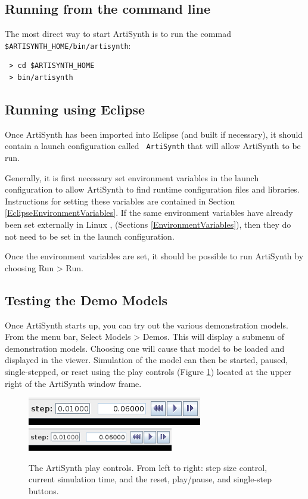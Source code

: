 \documentclass{article}
\def\SEP{/}
\def\SYSTEM{Linux }
\begin{document}
\subsection{Running from the command line}
\label{artisynthCommandLine}

The most direct way to start ArtiSynth is to run the commad
{\tt \$ARTISYNTH\_HOME\SEP bin\SEP artisynth}:

\begin{verbatim}
 > cd $ARTISYNTH_HOME
 > bin/artisynth
\end{verbatim}

\subsection{Running using Eclipse}

Once ArtiSynth has been imported into Eclipse (and built if
necessary), it should contain a launch configuration called {\tt
ArtiSynth} that will allow ArtiSynth to be run.

Generally, it is first necessary set environment variables in the
launch configuration to allow ArtiSynth to find runtime configuration
files and libraries. Instructions for setting these variables are
contained in Section \ref{EclipseEnvironmentVariables}.  If the same
environment variables have already been set externally in \SYSTEM,
(Sections \ref{EnvironmentVariables}), then they do not need to be set
in the launch configuration.

Once the environment variables are set, it should be possible to run
ArtiSynth by choosing {\sf Run > Run}.

\subsection{Testing the Demo Models}

Once ArtiSynth starts up, you can try out the various demonstration
models. From the menu bar, Select {\sf Models > Demos}.  This
will display a submenu of demonstration models. Choosing one will
cause that model to be loaded and displayed in the viewer.  Simulation
of the model can then be started, paused, single-stepped, or reset
using the play controls (Figure \ref{PlayControlsFig})
located at the upper right of the ArtiSynth window frame.

\begin{figure}
\begin{center}
\iflatexml
\includegraphics[]{images/playControls}
\else
\includegraphics[width=2.5in]{images/playControls}
\fi
\end{center}
\caption{The ArtiSynth play controls. From left to right: step size
control, current simulation time, and the reset, play/pause, and
single-step buttons.}%
\label{PlayControlsFig}
\end{figure}
\end{document}
